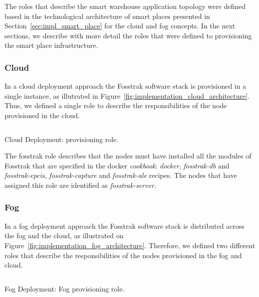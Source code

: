 The roles that describe the smart warehouse application topology were defined based in the
technological architecture of smart places presented in Section~\ref{sec:impl_smart_place} for the
cloud and fog concepts. In the next sections, we describe with more detail the roles that were
defined to provisioning the smart place infrastructure.

\subsubsection{Cloud}
\label{sub:cloud_provisioning}
In a cloud deployment approach the Fosstrak software stack is provisioned in a single instance, as
illutrated in Figure~\ref{fig:implementation_cloud_architecture}. Thus, we defined a single role
to describe the responsibilities of the node provisioned in the cloud.\\

\begin{listing}[ht!]
  \inputminted[frame=lines,
                 framesep=3mm,
                 linenos=true,
                 xleftmargin=21pt,
                 tabsize=4]{json}{./listings/fosstrak_role.json}
  \caption{Cloud Deployment: provisioning role.}
  \label{listing:cloud_recipe}
\end{listing}

The fosstrak role describes that the nodes must have installed all the modules of Fosstrak
that are specified in the docker \textit{cookbook}: \textit{docker}, \textit{fosstrak-db} and
\textit{fosstrak-epcis}, \textit{fosstrak-capture} and \textit{fosstrak-ale} recipes. The nodes
that have assigned this role are identified as \textit{fosstrak-server}.


\subsubsection{Fog}
\label{subs:fog_provisioning}
In a fog deployment approach the Fosstrak software stack is distributed across the fog and the cloud,
as illustrated on Figure~\ref{fig:implementation_fog_architecture}. Therefore, we defined two different
roles that describe the responsibilities of the nodes provisioned in the fog and cloud.

\begin{listing}[ht!]
  \inputminted[frame=lines,
                 framesep=3mm,
                 linenos=true,
                 xleftmargin=21pt,
                 tabsize=4]{json}{./listings/fog_role.json}
  \caption{Fog Deployment: Fog provisioning role.}
  \label{listing:fog_fog_recipe}
\end{listing}

